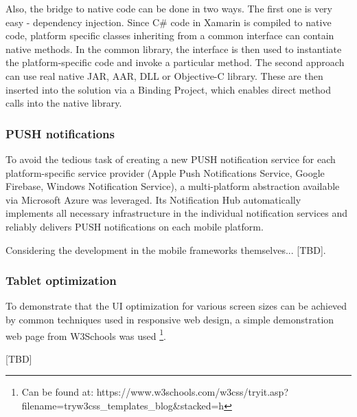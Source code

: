 \documentclass[english,master,public,dept460,male,cpdeclaration,oneside]{diploma}
\begin{document}
Also, the bridge to native code can be done in two ways. The first one is very easy - dependency injection. Since C\# code in Xamarin is compiled to native code, platform specific classes inheriting from a common interface can contain native methods. In the common library, the interface is then used to instantiate the platform-specific code and invoke a particular method. The second approach can use real native JAR, AAR, DLL or Objective-C library. These are then inserted into the solution via a Binding Project, which enables direct method calls into the native library.

\subsubsection{PUSH notifications}
To avoid the tedious task of creating a new PUSH notification service for each platform-specific service provider (Apple Push Notifications Service, Google Firebase, Windows Notification Service), a multi-platform abstraction available via Microsoft Azure was leveraged. Its Notification Hub automatically implements all necessary infrastructure in the individual notification services and reliably delivers PUSH notifications on each mobile platform.

Considering the development in the mobile frameworks themselves... [TBD].

\subsubsection{Tablet optimization}
To demonstrate that the UI optimization for various screen sizes can be achieved by common techniques used in responsive web design, a simple demonstration web page from W3Schools was used \footnote{Can be found at: https://www.w3schools.com/w3css/tryit.asp?filename=tryw3css\_templates\_blog\&stacked=h}.

[TBD]
\end{document}
